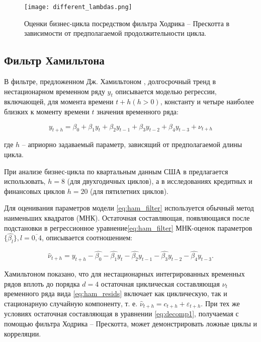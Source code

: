 \documentclass[a4paper,14pt]{extreport}
\begin{document}
	\begin{figure}
		\label{fig:different_lambda}
		\texttt{[image: different\_lambdas.png]}
		\caption{Оценки бизнес-цикла посредством фильтра Ходрика – Прескотта в зависимости от предполагаемой продолжительности цикла.}
	\end{figure} 	
	
	\subsection{Фильтр Хамильтона}
	
	В фильтре, предложенном Дж. Хамильтоном \cite{hamHP}, долгосрочный тренд в нестационарном временном ряду $y_t$ описывается моделью регрессии, включающей, для момента времени $t+h (h>0)$, константу и четыре наиболее близких к моменту времени $t$ значения временного ряда: 
	
	\begin{equation}
	y_{t+h} = \beta_0 + \beta_1 y_t + \beta_2 y_{t-1} 
	+ \beta_3 y_{t-2} + \beta_4 y_{t-3} + \nu_{t+h}
	\label{eq:ham_filter}
	\end{equation}
	
	где $h$ – априорно задаваемый параметр, зависящий от предполагаемой длины цикла. 
	
	При анализе бизнес-цикла по квартальным данным США в \cite{hamHP} предлагается использовать, $h=8$ (для двухгодичных циклов), а в исследованиях кредитных и финансовых циклов $h=20$ (для пятилетних циклов).
	
	Для оценивания параметров модели \ref{eq:ham_filter} используется обычный метод наименьших квадратов (МНК). Остаточная составляющая, появляющаяся после подстановки в регрессионное уравнение\ref{eq:ham_filter} МНК-оценок параметров $\{\hat{\beta_l}\}, l=\overline{0,4}$, описывается соотношением:
	
	\begin{equation}
	\hat{\nu}_{t+h} = y_{t+h} - \hat{\beta_0} - \hat{\beta_1} y_t 
	- \hat{\beta_2} y_{t-1} - \hat{\beta_3} y_{t-2} - \hat{\beta_4} y_{t-3} .
	\label{eq:ham_resids}
	\end{equation}	
	
	Хамильтоном показано, что для нестационарных интегрированных временных рядов вплоть до порядка $d=4$ остаточная циклическая составляющая $\nu_t$ временного ряда вида \ref{eq:ham_resids} включает как циклическую, так и стационарную случайную компоненту, т. е. $\hat{\nu}_{t+h}=c_{t+h} + \varepsilon_{t+h}$. При тех же условиях остаточная составляющая в уравнении \ref{eq:decomp1}, получаемая с помощью фильтра Ходрика – Прескотта, может демонстрировать ложные циклы и корреляции. 
	
\end{document}
